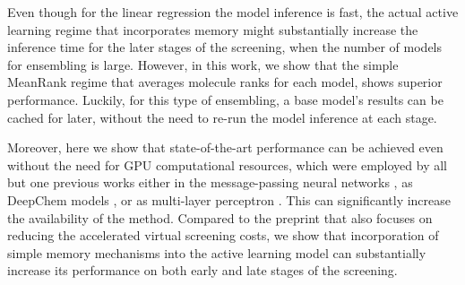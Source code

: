 Even though for the linear regression the model inference is fast, the actual active learning regime that incorporates memory might substantially increase the inference time for the later stages of the screening, when the number of models for ensembling is large. However, in this work, we show that the simple MeanRank regime that averages molecule ranks for each model, shows superior performance. Luckily, for this type of ensembling, a base model's results can be cached for later, without the need to re-run the model inference at each stage.

Moreover, here we show that state-of-the-art performance can be achieved even without the need for GPU computational resources, which were employed by all but one previous works either in the message-passing neural networks \cite{Graff2021AcceleratingLearning}, as DeepChem models \cite{Yang2021_shoichet_active_learning}, or as multi-layer perceptron \cite{deepdocking}. This can significantly increase the availability of the method. Compared to the preprint \cite{logistic_regression} that also focuses on reducing the accelerated virtual screening costs, we show that incorporation of simple memory mechanisms into the active learning model can substantially increase its performance on both early and late stages of the screening.
